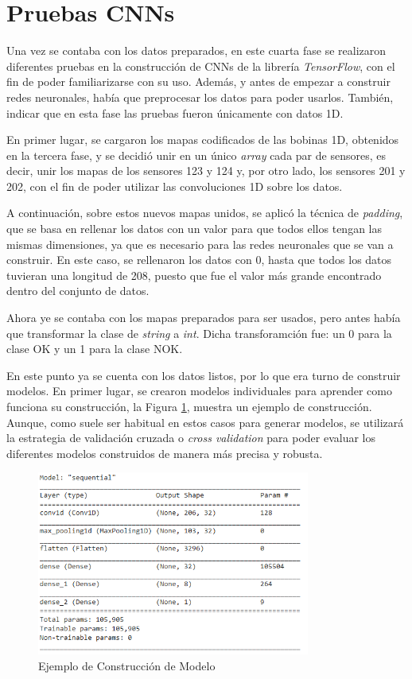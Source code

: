 \section{Pruebas CNNs}
Una vez se contaba con los datos preparados, en este cuarta fase se realizaron diferentes pruebas en la construcción de CNNs de la librería \emph{TensorFlow}, con el fin de poder familiarizarse con su uso. Además, y antes de empezar a construir redes neuronales, había que preprocesar los datos para poder usarlos. También, indicar que en esta fase las pruebas fueron únicamente con datos 1D.

En primer lugar, se cargaron los mapas codificados de las bobinas 1D, obtenidos en la tercera fase, y se decidió unir en un único \emph{array} cada par de sensores, es decir, unir los mapas de los sensores 123 y 124 y, por otro lado, los sensores 201 y 202, con el fin de poder utilizar las convoluciones 1D sobre los datos.

A continuación, sobre estos nuevos mapas unidos, se aplicó la técnica de \emph{padding}, que se basa en rellenar los datos con un valor para que todos ellos tengan las mismas dimensiones, ya que es necesario para las redes neuronales que se van a construir. En este caso, se rellenaron los datos con 0, hasta que todos los datos tuvieran una longitud de 208, puesto que fue el valor más grande encontrado dentro del conjunto de datos.

Ahora ye se contaba con los mapas preparados para ser usados, pero antes había que transformar la clase de \emph{string} a \emph{int}. Dicha transforamción fue: un 0 para la clase OK y un 1 para la clase NOK.

En este punto ya se cuenta con los datos listos, por lo que era turno de construir modelos. En primer lugar, se crearon modelos individuales para aprender como funciona su construcción, la Figura \ref{f:modelo1}, muestra un ejemplo de construcción. Aunque, como suele ser habitual en estos casos para generar modelos, se utilizará la estrategia de validación cruzada  o \emph{cross validation} para poder evaluar los diferentes modelos construidos de manera más precisa y robusta.

\begin{figure}[h]
 \centering
  \includegraphics[width=0.8\textwidth]{img/modelo1.PNG}
 \caption{Ejemplo de Construcción de Modelo}
 \label{f:modelo1}
\end{figure}

